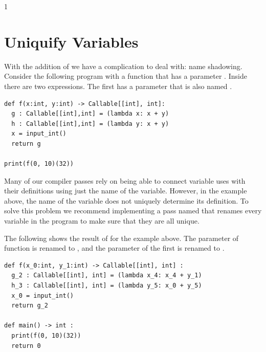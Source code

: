 \documentclass[7x10]{TimesAPriori_MIT}%
\def\racketEd{0}
\def\pythonEd{1}
\def\edition{1}
\newcommand{\racket}[1]{{\if\edition\racketEd{#1}\fi}}
\newcommand{\pythonColor}[0]{}
\newcommand{\python}[1]{{\if\edition\pythonEd\pythonColor #1\fi}}
\numberwithin{theorem}{chapter}
\numberwithin{definition}{chapter}
\numberwithin{equation}{chapter}
\begin{document}
{\if\edition\pythonEd\pythonColor
\section{Uniquify Variables}
\label{sec:uniquify-lambda}

With the addition of  we have a complication to deal
with: name shadowing. Consider the following program with a function
 that has a parameter . Inside  there are two
 expressions. The first  has a parameter
that is also named .

\begin{lstlisting}
def f(x:int, y:int) -> Callable[[int], int]:
  g : Callable[[int],int] = (lambda x: x + y)
  h : Callable[[int],int] = (lambda y: x + y)
  x = input_int()
  return g

print(f(0, 10)(32))
\end{lstlisting}

Many of our compiler passes rely on being able to connect variable
uses with their definitions using just the name of the
variable. However, in the example above, the name of the variable does
not uniquely determine its definition. To solve this problem we
recommend implementing a pass named  that renames every
variable in the program to make sure that they are all unique.

The following shows the result of  for the example
above. The  parameter of function  is renamed to
, and the  parameter of the first  is
renamed to .

\begin{lstlisting}
def f(x_0:int, y_1:int) -> Callable[[int], int] :
  g_2 : Callable[[int], int] = (lambda x_4: x_4 + y_1)
  h_3 : Callable[[int], int] = (lambda y_5: x_0 + y_5)
  x_0 = input_int()
  return g_2

def main() -> int :
  print(f(0, 10)(32))
  return 0
\end{lstlisting}

\fi} %


\end{document}
